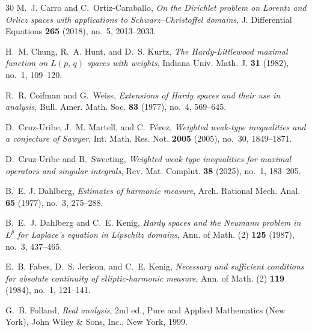 \documentclass[12pt]{amsart}
\theoremstyle{plain}
\theoremstyle{definition}
\numberwithin{equation}{section}
\begin{document}
\begin{thebibliography}{30}
M.~J. Carro and C.~Ortiz-Caraballo,
\textit{On the Dirichlet problem on Lorentz and Orlicz spaces with applications to Schwarz–Christoffel domains},
J. Differential Equations \textbf{265} (2018), no.~5, 2013--2033.





H.~M. Chung, R.~A. Hunt, and D.~S. Kurtz,
\textit{The Hardy-Littlewood maximal function on {$L(p,\,q)$} spaces with weights},
Indiana Univ. Math. J. \textbf{31} (1982), no.~1, 109--120.




R.~R. Coifman and G.~Weiss,
\textit{Extensions of Hardy spaces and their use in analysis},
Bull. Amer. Math. Soc. \textbf{83} (1977), no.~4, 569--645.



D.~Cruz-Uribe, J.~M. Martell, and C.~Pérez,
\textit{Weighted weak-type inequalities and a conjecture of Sawyer},
Int. Math. Res. Not. \textbf{2005} (2005), no.~30, 1849--1871.




D.~Cruz-Uribe and B.~Sweeting,
\textit{Weighted weak-type inequalities for maximal operators and singular integrals},
Rev. Mat. Complut. \textbf{38} (2025), no.~1, 183--205.






B.~E. J. Dahlberg,
\textit{Estimates of harmonic measure},
Arch. Rational Mech. Anal. \textbf{65} (1977), no.~3, 275--288.



B.~E.~J. Dahlberg and C.~E. Kenig,
\textit{Hardy spaces and the Neumann problem in {$L^p$} for Laplace's equation in Lipschitz domains},
Ann. of Math. (2) \textbf{125} (1987), no.~3, 437--465.





E.~B. Fabes, D.~S. Jerison, and C.~E. Kenig,
\textit{Necessary and sufficient conditions for absolute continuity of elliptic-harmonic measure},
Ann. of Math. (2) \textbf{119} (1984), no.~1, 121--141.







G.~B. Folland,
\textit{Real analysis}, 2nd ed.,
Pure and Applied Mathematics (New York), John Wiley \& Sons, Inc., New York, 1999.





\end{thebibliography}
\end{document}
